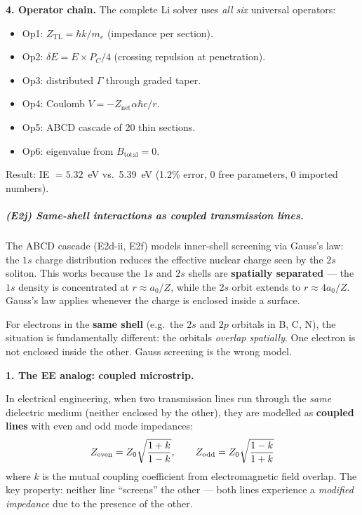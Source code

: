 \noindent\textbf{4. Operator chain.}
The complete Li solver uses \emph{all six}
universal operators:
\begin{itemize}
    \item Op1: $Z_{\text{TL}} = \hbar k/m_e$
          (impedance per section).
    \item Op2: $\delta E = E \times P_C/4$
          (crossing repulsion at penetration).
    \item Op3: distributed $\Gamma$ through
          graded taper.
    \item Op4: Coulomb $V = -Z_{\text{net}}
          \alpha\hbar c / r$.
    \item Op5: ABCD cascade of 20 thin sections.
    \item Op6: eigenvalue from
          $B_{\text{total}} = 0$.
\end{itemize}
Result: IE $ = 5.32$~eV vs.\ 5.39~eV
(1.2\% error, 0 free parameters, 0 imported
numbers).

\subparagraph{(E2j) Same-shell interactions as
coupled transmission lines.}

The ABCD cascade (E2d-ii, E2f) models inner-shell
screening via Gauss's law: the $1s$ charge
distribution reduces the effective nuclear charge
seen by the $2s$ soliton.  This works because the
$1s$ and $2s$ shells are \textbf{spatially separated}
--- the $1s$ density is concentrated at
$r \approx a_0/Z$, while the $2s$ orbit extends to
$r \approx 4a_0/Z$.  Gauss's law applies whenever the
charge is enclosed inside a surface.

For electrons in the \textbf{same shell} (e.g.\ the
$2s$ and $2p$ orbitals in B, C, N), the situation is
fundamentally different: the orbitals \emph{overlap
spatially}.  One electron is not enclosed inside the
other.  Gauss screening is the wrong model.

\noindent\textbf{1. The EE analog: coupled microstrip.}

In electrical engineering, when two transmission
lines run through the \emph{same} dielectric medium
(neither enclosed by the other), they are modelled
as \textbf{coupled lines} with even and odd mode
impedances:
\begin{equation}
    Z_{\rm even} = Z_0 \sqrt{\frac{1+k}{1-k}},
    \qquad
    Z_{\rm odd} = Z_0 \sqrt{\frac{1-k}{1+k}}
    \label{eq:coupled_line_zo_ze}
\end{equation}
where $k$ is the mutual coupling coefficient from
electromagnetic field overlap.  The key property:
neither line ``screens'' the other --- both lines
experience a \emph{modified impedance} due to the
presence of the other.

